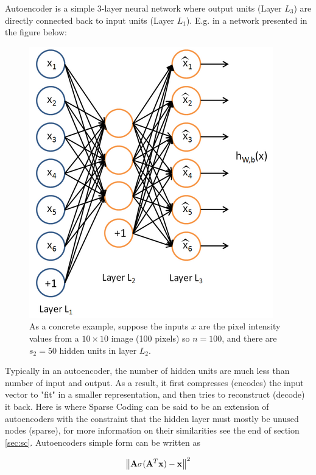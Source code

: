 Autoencoder is a simple 3-layer neural network where output units (Layer $L_3$) are directly connected back to input units (Layer $L_1$). E.g. in a network presented in the figure below:

\begin{figure}[H]
	\centering
	\includegraphics[scale=0.3]{./figures/autoencoder}
	\caption[Caption for LOF]{As a concrete example, suppose the inputs $x$ are the pixel intensity values from a $10 \times 10$ image (100 pixels) so  $n=100$, and there are $s_2=50$ hidden units in layer $L_2$.	\protect\footnotemark}
	\label{fig:autoencoder}
\end{figure}
Typically in an autoencoder, the number of hidden units are much less than number of input and output. As a result, it first compresses (encodes) the input vector to "fit" in a smaller representation, and then tries to reconstruct (decode) it back. Here is where Sparse Coding can be said to be an extension of autoencoders with the constraint that the hidden layer must mostly be unused nodes (sparse), for more information on their similarities see the end of section \ref{sec:sc}. Autoencoders simple form can be written as

\begin{equation}
\label{eq:auto}
\left\lVert\mathbf{A}\sigma(\mathbf{A}^T \mathbf{x}) - \mathbf{x}\right\rVert^2
\end{equation}

